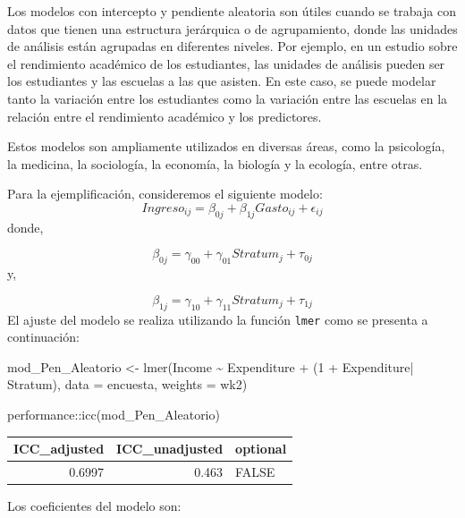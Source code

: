 \documentclass[
  12pt,
]{book}
\newenvironment{Shaded}{\begin{snugshade}}{\end{snugshade}}
\newcommand{\AttributeTok}[1]{\textcolor[rgb]{0.77,0.63,0.00}{#1}}
\newcommand{\DecValTok}[1]{\textcolor[rgb]{0.00,0.00,0.81}{#1}}
\newcommand{\FunctionTok}[1]{\textcolor[rgb]{0.00,0.00,0.00}{#1}}
\newcommand{\NormalTok}[1]{#1}
\newcommand{\OtherTok}[1]{\textcolor[rgb]{0.56,0.35,0.01}{#1}}
\newcommand{\SpecialCharTok}[1]{\textcolor[rgb]{0.00,0.00,0.00}{#1}}
\begin{document}
Los modelos con intercepto y pendiente aleatoria son útiles cuando se trabaja con datos que tienen una estructura jerárquica o de agrupamiento, donde las unidades de análisis están agrupadas en diferentes niveles. Por ejemplo, en un estudio sobre el rendimiento académico de los estudiantes, las unidades de análisis pueden ser los estudiantes y las escuelas a las que asisten. En este caso, se puede modelar tanto la variación entre los estudiantes como la variación entre las escuelas en la relación entre el rendimiento académico y los predictores.

Estos modelos son ampliamente utilizados en diversas áreas, como la psicología, la medicina, la sociología, la economía, la biología y la ecología, entre otras.

Para la ejemplificación, consideremos el siguiente modelo:
\[
Ingreso_{ij}=\beta_{0j}+\beta_{1j}Gasto_{ij}+\epsilon_{ij}
\]
donde,

\[
\beta_{0j} = \gamma_{00}+\gamma_{01}Stratum_{j} + \tau_{0j}
\]
y,

\[
\beta_{1j} = \gamma_{10}+\gamma_{11}Stratum_{j} + \tau_{1j}
\]
El ajuste del modelo se realiza utilizando la función \texttt{lmer} como se presenta a continuación:

\begin{Shaded}
\begin{Highlighting}[]
\NormalTok{mod\_Pen\_Aleatorio }\OtherTok{\textless{}{-}} \FunctionTok{lmer}\NormalTok{(Income }\SpecialCharTok{\textasciitilde{}}\NormalTok{ Expenditure  }\SpecialCharTok{+}\NormalTok{ (}\DecValTok{1} \SpecialCharTok{+}\NormalTok{ Expenditure}\SpecialCharTok{|}\NormalTok{ Stratum),}
  \AttributeTok{data =}\NormalTok{ encuesta, }\AttributeTok{weights  =}\NormalTok{  wk2)}

\NormalTok{performance}\SpecialCharTok{::}\FunctionTok{icc}\NormalTok{(mod\_Pen\_Aleatorio)}
\end{Highlighting}
\end{Shaded}

\begin{tabular}{r|r|l}
\hline
ICC\_adjusted & ICC\_unadjusted & optional\\
\hline
0.6997 & 0.463 & FALSE\\
\hline
\end{tabular}

Los coeficientes del modelo son:

\begin{Shaded}
\end{Shaded}
\end{document}
